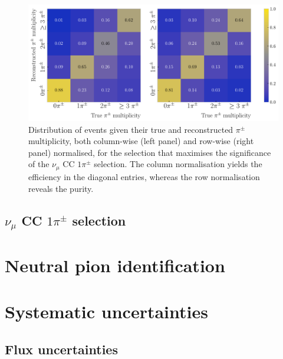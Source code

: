 \begin{figure}[t]
    \centering
    \includegraphics[width=.99\linewidth]{Images/GAr_selection/pion_selection_metrics_matrix_max_significance.pdf}
    \caption[Row and column normalised distributions of events given their true and reconstructed $\pi^{\pm}$ multiplicity, for the selection that maximises the significance of the $\nu_{\mu}$ CC $1\pi^{\pm}$ selection.]{Distribution of events given their true and reconstructed $\pi^{\pm}$ multiplicity, both column-wise (left panel) and row-wise (right panel) normalised, for the selection that maximises the significance of the $\nu_{\mu}$ CC $1\pi^{\pm}$ selection. The column normalisation yields the efficiency in the diagonal entries, whereas the row normalisation reveals the purity.}
    \label{fig:pion_selection_metrics}
\end{figure}


\subsection[\texorpdfstring{$\nu_{\mu}$}{numu} CC \texorpdfstring{$1\pi^{\pm}$}{1pi} selection]{\boldmath\texorpdfstring{$\nu_{\mu}$}{numu} CC \boldmath\texorpdfstring{$1\pi^{\pm}$}{1pi} selection}


\section{Neutral pion identification}


\section{Systematic uncertainties}

\subsection{Flux uncertainties}

